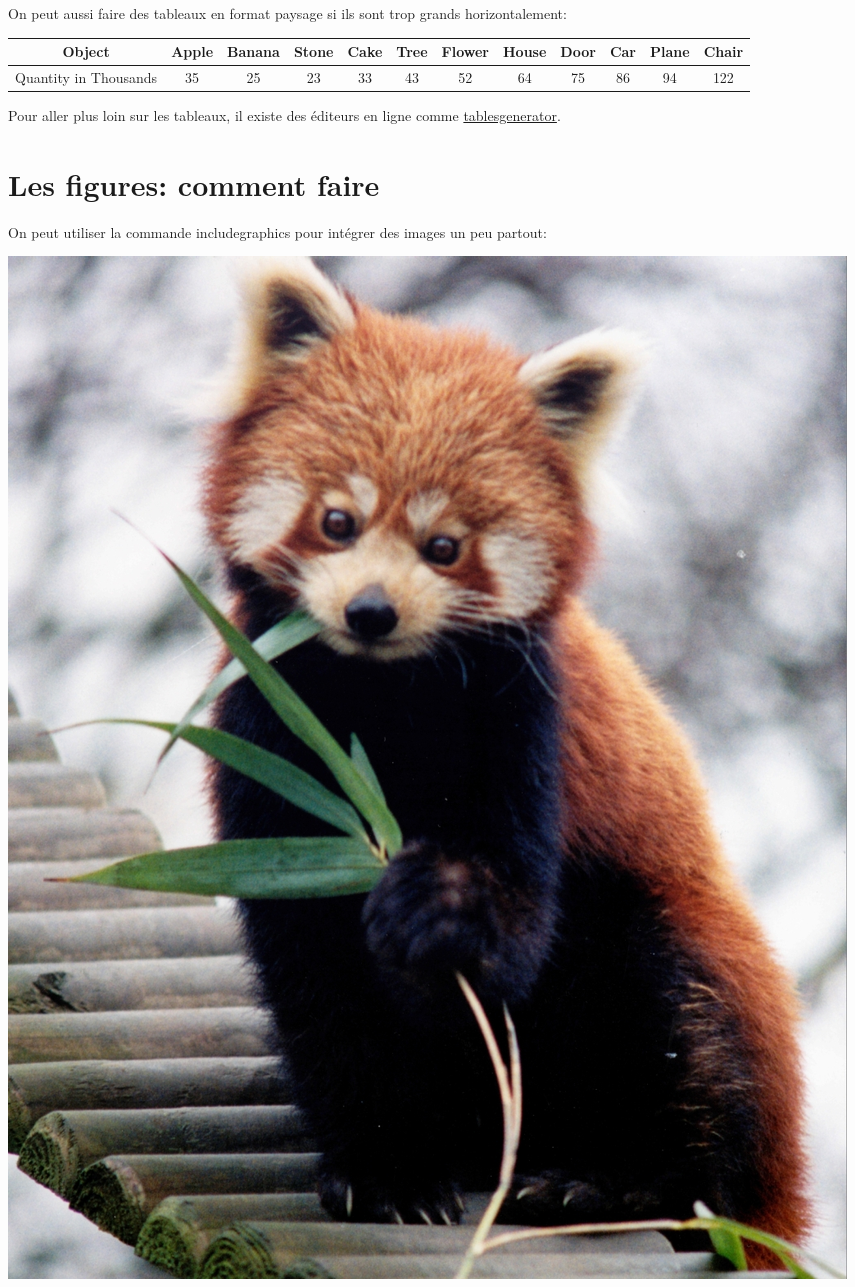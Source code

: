 \documentclass[10pt,a4paper]{article}
\begin{document}
\blindtext[5] %
	
On peut aussi faire des tableaux en format paysage si ils sont trop grands horizontalement:
	
\begin{landscape}
\begin{tabular}{|c|c|c|c|c|c|c|c|c|c|c|c|}\hline

Object & Apple & Banana & Stone & Cake & Tree & Flower & House & Door & Car & Plane & Chair \\ \hline 

Quantity in Thousands & 35  &  25  & 23 & 33 & 43  & 52 & 64 & 75 & 86  & 94  & 122  \\ \hline 

\end{tabular}
\end{landscape}

Pour aller plus loin sur les tableaux, il existe des éditeurs en ligne comme \href{https://www.tablesgenerator.com/latex_tables#}{tablesgenerator}.


\section{Les figures: comment faire}

On peut utiliser la commande \og includegraphics \fg pour intégrer des images un peu partout:

\begin{center}
\includegraphics[width=.8\textwidth]{figures/firefox.jpg} %
\end{center}
\end{document}
